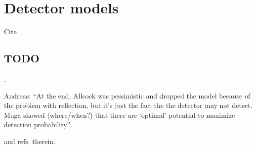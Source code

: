 \section{Detector models}

Cite \cite{
  Allcock-1, Allcock-2, Allcock-3,
  Muga_ArrTimeOpNormal, Damborenea,
  Sudarshan_Zeno,
  Echanobe,
  Savvidou-1, Savvidou-2,
  ComplexAbsPot,
}

\subsection{TODO}

\cite[sec. 2-4]{Allcock-2}.

Andreas: ``At the end, Allcock was pessimistic and dropped the model because of the problem with reflection,
but it's just the fact the the detector may not detect. Muga showed (where/when?)
that there are `optimal' potential to maximize detection probability''

\cite[Sec. 1.4.3]{TQM1} and refs. therein.

\cite[Ch. 4]{TQM2}
